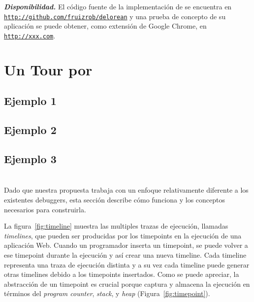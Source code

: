 \documentclass[conference]{IEEEtran}
\begin{document}
{\bf {\em Disponibilidad.}} El c\'odigo fuente de la implementaci\'on de \deloreanjs se encuentra en {\tt \url{http://github.com/fruizrob/delorean}} y una prueba de concepto de su aplicaci\'on se puede obtener, como extensi\'on de Google Chrome, en {\tt \url{http://xxx.com}}. 



\section{Un Tour por \deloreanjs}
\label{sec:tour}


\subsection{Ejemplo 1}
\label{sec:tour1}


\subsection{Ejemplo 2}
\label{sec:tour2}


\subsection{Ejemplo 3}
\label{sec:tour3}


\bigskip

\section{\deloreanjs}
\label{sec:deloreanjs}

Dado que nuestra propuesta trabaja con un enfoque relativamente diferente a los existentes debuggers, esta secci\'on describe c\'omo funciona \deloreanjs y los conceptos necesarios para construirla.   


La figura~\ref{fig:timeline} muestra las multiples trazas de ejecuci\'on, llamadas {\em timelines}, que pueden ser producidas por los timepoints en la ejecuci\'on de una aplicaci\'on Web. Cuando un programador inserta un timepoint, se puede volver a ese timepoint durante la ejecuci\'on y as\'i crear una nueva timeline. Cada timeline representa una traza de ejecuci\'on distinta y a su vez cada timeline puede generar otras timelines debido a los timepoints insertados. Como se puede apreciar, la abstracci\'on de un timepoint es crucial porque captura y almacena la ejecuci\'on en t\'erminos del {\em program counter}, {\em stack}, y {\em heap} (Figura~\ref{fig:timepoint}).      
  
\end{document}
